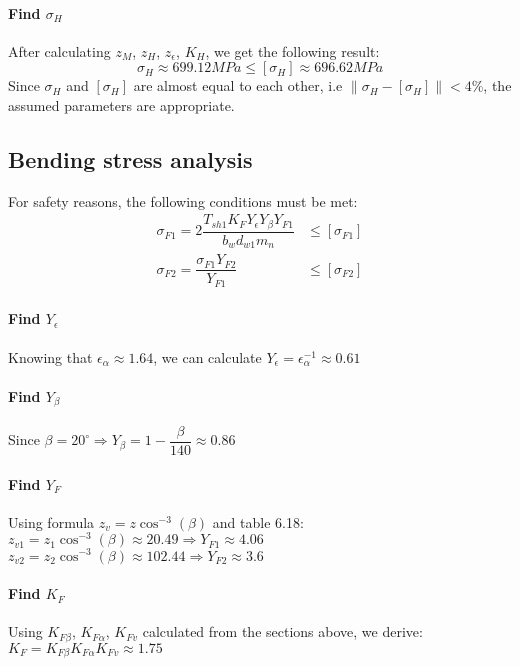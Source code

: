 \paragraph{Find $ \sigma_H $} After calculating $ z_M $, $ z_H $, $ z_\epsilon $, $ K_H $, we get the following result:
	\[\sigma_H \approx 699.12\unit{MPa}\leq [\sigma_H] \approx 696.62\unit{MPa}\] 
	Since $ \sigma_H $ and $ [\sigma_H] $ are almost equal to each other, i.e $ \left\| \sigma_H - [\sigma_H]\right\| < 4\%$, the assumed parameters are appropriate.


\subsection{Bending stress analysis}
For safety reasons, the following conditions must be met:
\begin{align}
	\sigma_{F1} = 2\dfrac{T_{sh1}K_FY_\epsilon Y_\beta Y_{F1}}{b_wd_{w1}m_n} & \leq [\sigma_{F1}] \label{scond1}\\
	\sigma_{F2} = \dfrac{\sigma_{F1}Y_{F2}}{Y_{F1}} & \leq [\sigma_{F2}] \label{scond2}
\end{align}
\paragraph{Find $ Y_\epsilon $} Knowing that $ \epsilon_\alpha \approx 1.64 $, we can calculate $ Y_\epsilon = \epsilon_\alpha^{-1} \approx 0.61 $
\paragraph{Find $ Y_\beta $} Since $ \beta = 20^\circ \Rightarrow Y_\beta = 1-\dfrac{\beta}{140}\approx0.86$
\paragraph{Find $ Y_F $} Using formula $ z_v = z\cos^{-3}(\beta) $ and table 6.18:\\
$ z_{v1} = z_1\cos^{-3}(\beta) \approx 20.49 \Rightarrow Y_{F1} \approx 4.06$\\
$ z_{v2} = z_2\cos^{-3}(\beta) \approx 102.44 \Rightarrow Y_{F2} \approx 3.6 $
\paragraph{Find $ K_F $}
Using $ K_{F\beta} $, $ K_{F\alpha} $, $ K_{Fv} $ calculated from the sections above, we derive:\\ $ K_F = K_{F\beta}K_{F\alpha}K_{Fv} \approx 1.75 $
